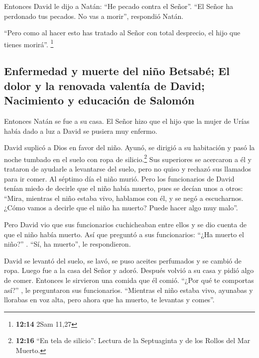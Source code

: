  Entonces David le dijo a Natán: ``He pecado contra el
Señor''. ``El Señor ha perdonado tus pecados. No vas a morir'',
respondió Natán.

 ``Pero como al hacer esto has tratado al Señor con total
desprecio, el hijo que tienes morirá''. \footnote{\textbf{12:14} 2Sam
  11,27}

\hypertarget{enfermedad-y-muerte-del-niuxf1o-betsabuxe9-el-dolor-y-la-renovada-valentuxeda-de-david-nacimiento-y-educaciuxf3n-de-salomuxf3n}{%
\subsection{Enfermedad y muerte del niño Betsabé; El dolor y la renovada
valentía de David; Nacimiento y educación de
Salomón}\label{enfermedad-y-muerte-del-niuxf1o-betsabuxe9-el-dolor-y-la-renovada-valentuxeda-de-david-nacimiento-y-educaciuxf3n-de-salomuxf3n}}

 Entonces Natán se fue a su casa. El Señor hizo que el
hijo que la mujer de Urías había dado a luz a David se pusiera muy
enfermo.

 David suplicó a Dios en favor del niño. Ayunó, se
dirigió a su habitación y pasó la noche tumbado en el suelo con ropa de
silicio.\footnote{\textbf{12:16} ``En tela de silicio'': Lectura de la
  Septuaginta y de los Rollos del Mar Muerto.}  Sus
superiores se acercaron a él y trataron de ayudarle a levantarse del
suelo, pero no quiso y rechazó sus llamados para ir comer.
 Al séptimo día el niño murió. Pero los funcionarios de
David tenían miedo de decirle que el niño había muerto, pues se decían
unos a otros: ``Mira, mientras el niño estaba vivo, hablamos con él, y
se negó a escucharnos. ¿Cómo vamos a decirle que el niño ha muerto?
Puede hacer algo muy malo''.

 Pero David vio que sus funcionarios cuchicheaban entre
ellos y se dio cuenta de que el niño había muerto. Así que preguntó a
sus funcionarios: ``¿Ha muerto el niño?'' . ``Sí, ha muerto'', le
respondieron.

 David se levantó del suelo, se lavó, se puso aceites
perfumados y se cambió de ropa. Luego fue a la casa del Señor y adoró.
Después volvió a su casa y pidió algo de comer. Entonces le sirvieron
una comida que él comió.  ``¿Por qué te comportas así?''
, le preguntaron sus funcionarios. ``Mientras el niño estaba vivo,
ayunabas y llorabas en voz alta, pero ahora que ha muerto, te levantas y
comes''.

